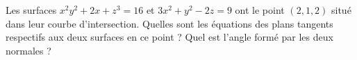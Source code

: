 \begin{exercice}\label{exoFoncDeuxVar0005}

Les surfaces $x^2y^2+2x+z^3=16$ et $3x^2+y^2-2z=9$ ont le point $(2,1,2)$ situé dans leur courbe d'intersection. Quelles sont les équations des plans tangents respectifs aux deux surfaces en ce point ? Quel est l'angle formé par les deux normales ?

\end{exercice}

